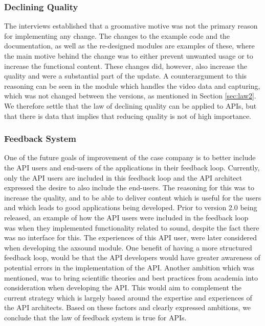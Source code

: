 \documentclass{sig-alternate}
\begin{document}
\subsubsection{Declining Quality} %
The interviews established that a groomative motive was not the primary reason for implementing any change. The changes to the example code and the documentation, as well as the re-designed modules are examples of these, where the main motive behind the change was to either prevent unwanted usage or to increase the functional content. These changes did, however, also increase the quality and were a substantial part of the update. A counterargument to this reasoning can be seen in the module which handles the video data and capturing, which was not changed between the versions, as mentioned in Section \ref{sec:law2}. We therefore settle that the law of declining quality can be applied to APIs, but that there is data that implies that reducing quality is not of high importance. 

\subsubsection{Feedback System} %
One of the future goals of improvement of the case company is to better include the API users and end-users of the applications in their feedback loop. Currently, only the API users are included in this feedback loop and the API architect expressed the desire to also include the end-users. The reasoning for this was to increase the quality, and to be able to deliver content which is useful for the users and which leads to good applications being developed. Prior to version 2.0 being released, an example of how the API users were included in the feedback loop was when they implemented functionality related to sound, despite the fact there was no interface for this.  The experiences of this API user, were later considered when developing the axsound module. One benefit of having a more structured feedback loop, would be that the API developers would have greater awareness of potential errors in the implementation of the API. Another ambition which was mentioned, was to bring scientific theories and best practices from academia into consideration when developing the API. This would aim to complement the current strategy which is largely based around the expertise and experiences of the API architects. Based on these factors and clearly expressed ambitions, we conclude that the law of feedback system is true for APIs. 
\end{document}
